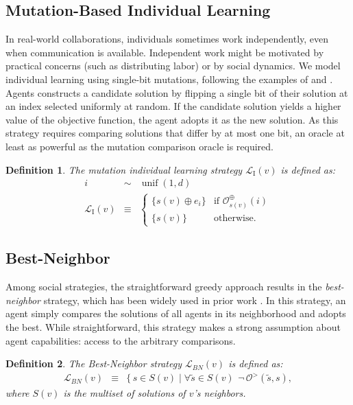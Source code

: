\documentclass[twocolumn,10pt]{article}
\newtheorem{definition}{Definition}
\DeclareMathOperator{\unif}{unif}
\begin{document}
\subsection{Mutation-Based Individual Learning}
In real-world collaborations, individuals sometimes work independently, even when communication is available. Independent work might be motivated by practical concerns (such as distributing labor) or by social dynamics. We model individual learning using single-bit mutations, following the examples of
\cite{lazer_network_2007} and \cite{barkoczi_social_2016}. Agents constructs a candidate solution by flipping a single bit of their solution at an index selected uniformly at random. If the candidate solution yields a higher value of the objective function, the agent adopts it as the new solution. As this strategy requires comparing solutions that differ by at most one bit, an oracle at least as powerful as the mutation comparison oracle is required.

\begin{definition}
The mutation individual learning strategy $\mathcal{L}_{\text{I}}(v)$ is defined as:
\begin{eqnarray}
i &\sim& \unif(1,d) \nonumber\\
\mathcal{L}_{\text{I}}(v) &\equiv&
\begin{cases}
\{s(v) \oplus e_i\} & \mbox{if $\mathcal{O}^{\oplus}_{s(v)}(i)$}
\\
\{s(v)\} & \mbox{otherwise}.
\end{cases}
\end{eqnarray}
\end{definition}

\subsection{Best-Neighbor}
Among social strategies, the straightforward greedy approach results in the {\em best-neighbor} strategy, which has been widely used in prior work \cite{lazer_network_2007, mason_propagation_2008, barkoczi_social_2016}. In this strategy, an agent simply compares the solutions of all agents in its neighborhood and adopts the best. While straightforward, this strategy makes a strong assumption about agent capabilities: access to the arbitrary comparisons.
\begin{definition}
The Best-Neighbor strategy $\mathcal{L}_{BN}(v)$ is defined as:
\begin{eqnarray}
\mathcal{L}_{BN}(v)
&\equiv&
\{ \, s \!\in\! S(v)
\mid
\forall \tilde{s} \!\in\! S(v) \, \
\lnot \, \mathcal{O}^{>}(\tilde{s}, s),
\end{eqnarray}
where $S(v)$ is the multiset of solutions of $v$'s neighbors.
\end{definition}
\end{document}
